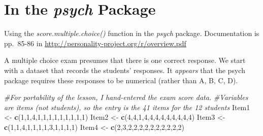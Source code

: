\documentclass[
  english,
]{book}
\newenvironment{Shaded}{\begin{snugshade}}{\end{snugshade}}
\newcommand{\CommentTok}[1]{\textcolor[rgb]{0.56,0.35,0.01}{\textit{#1}}}
\newcommand{\DecValTok}[1]{\textcolor[rgb]{0.00,0.00,0.81}{#1}}
\newcommand{\KeywordTok}[1]{\textcolor[rgb]{0.13,0.29,0.53}{\textbf{#1}}}
\newcommand{\NormalTok}[1]{#1}
\newcommand{\StringTok}[1]{\textcolor[rgb]{0.31,0.60,0.02}{#1}}
\begin{document}
\hypertarget{in-the-psych-package}{%
\section{\texorpdfstring{In the \emph{psych} Package}{In the psych Package}}\label{in-the-psych-package}}

Using the \emph{score.multiple.choice()} function in the \emph{psych} package. Documentation is pp.~85-86 in \url{http://personality-project.org/r/overview.pdf}

A multiple choice exam presumes that there is one correct response. We start with a dataset that records the students' responses. It \emph{appears} that the psych package requires these responses to be numerical (rather than A, B, C, D).

\begin{Shaded}
\begin{Highlighting}[]
\CommentTok{#For portability of the lesson, I hand-entered the exam score data. }
\CommentTok{#Variables are items (not students), so the entry is the 41 items for the 12 students}
\NormalTok{Item1 <-}\StringTok{ }\KeywordTok{c}\NormalTok{(}\DecValTok{1}\NormalTok{,}\DecValTok{1}\NormalTok{,}\DecValTok{4}\NormalTok{,}\DecValTok{1}\NormalTok{,}\DecValTok{1}\NormalTok{,}\DecValTok{1}\NormalTok{,}\DecValTok{1}\NormalTok{,}\DecValTok{1}\NormalTok{,}\DecValTok{1}\NormalTok{,}\DecValTok{1}\NormalTok{,}\DecValTok{1}\NormalTok{,}\DecValTok{1}\NormalTok{)}
\NormalTok{Item2 <-}\StringTok{ }\KeywordTok{c}\NormalTok{(}\DecValTok{4}\NormalTok{,}\DecValTok{4}\NormalTok{,}\DecValTok{1}\NormalTok{,}\DecValTok{4}\NormalTok{,}\DecValTok{4}\NormalTok{,}\DecValTok{4}\NormalTok{,}\DecValTok{4}\NormalTok{,}\DecValTok{4}\NormalTok{,}\DecValTok{4}\NormalTok{,}\DecValTok{4}\NormalTok{,}\DecValTok{4}\NormalTok{,}\DecValTok{4}\NormalTok{)}
\NormalTok{Item3 <-}\StringTok{ }\KeywordTok{c}\NormalTok{(}\DecValTok{1}\NormalTok{,}\DecValTok{1}\NormalTok{,}\DecValTok{4}\NormalTok{,}\DecValTok{1}\NormalTok{,}\DecValTok{1}\NormalTok{,}\DecValTok{1}\NormalTok{,}\DecValTok{1}\NormalTok{,}\DecValTok{3}\NormalTok{,}\DecValTok{1}\NormalTok{,}\DecValTok{1}\NormalTok{,}\DecValTok{1}\NormalTok{,}\DecValTok{1}\NormalTok{)}
\NormalTok{Item4 <-}\StringTok{ }\KeywordTok{c}\NormalTok{(}\DecValTok{2}\NormalTok{,}\DecValTok{3}\NormalTok{,}\DecValTok{2}\NormalTok{,}\DecValTok{2}\NormalTok{,}\DecValTok{2}\NormalTok{,}\DecValTok{2}\NormalTok{,}\DecValTok{2}\NormalTok{,}\DecValTok{2}\NormalTok{,}\DecValTok{2}\NormalTok{,}\DecValTok{2}\NormalTok{,}\DecValTok{2}\NormalTok{,}\DecValTok{2}\NormalTok{)}

\end{Highlighting}
\end{Shaded}
\end{document}
